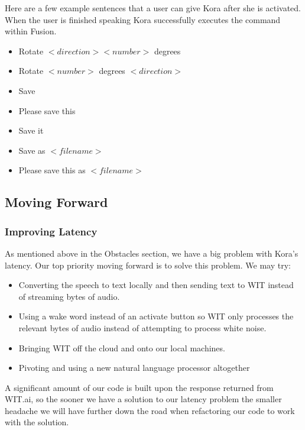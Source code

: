 \documentclass[onecolumn, draftclsnofoot,10pt, compsoc]{IEEEtran}
\begin{document}
			Here are a few example sentences that a user can give Kora after she is activated.
			When the user is finished speaking Kora successfully executes the command within Fusion.
			\begin{itemize}
				\item 
				Rotate $<direction> <number>$ degrees
				\item 
				Rotate $<number>$ degrees $<direction>$

				\item 
				Save
				
				\item 
				Please save this
				
				\item
				Save it

				\item 
				Save as $<file name>$
				
				\item 
				Please save this as $<file name>$
			\end{itemize}
		
		
	\subsection{Moving Forward}
		\subsubsection{Improving Latency}
			As mentioned above in the Obstacles section, we have a big problem with Kora's latency.
			Our top priority moving forward is to solve this problem.
			We may try:
			\begin{itemize}
				\item
				Converting the speech to text locally and then sending text to WIT instead of streaming bytes of audio.
				
				\item
				Using a wake word instead of an activate button so WIT only processes the relevant bytes of audio instead of attempting to process white noise.
				
				\item
				Bringing WIT off the cloud and onto our local machines.
				
				\item
				Pivoting and using a new natural language processor altogether
			\end{itemize}
			A significant amount of our code is built upon the response returned from WIT.ai, so the sooner we have a solution to our latency problem the smaller headache we will have further down the road when refactoring our code to work with the solution.
		
\end{document}
